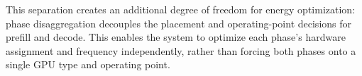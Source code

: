 This separation creates an additional degree of freedom for energy optimization: 
phase disaggregation decouples the placement and operating-point decisions for prefill and decode. 
This enables the system to optimize each phase's hardware assignment and frequency independently, rather than forcing both phases onto a single GPU type and operating point.


